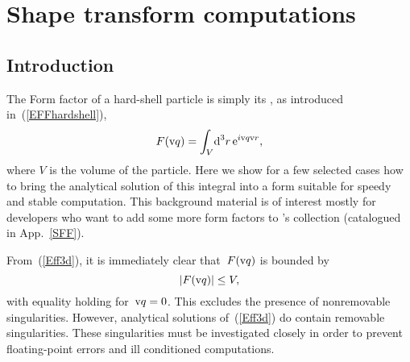 
\chapter{Shape transform computations}  \label{SFFcomp}


\section{Introduction}

The Form factor of a hard-shell particle is simply its ,
as introduced in~(\ref{EFFhardshell}),
\begin{equation}\label{Eff3d}
  F(\text{v}{q})=\int_V\!\text{d}^3r\, \text{e}^{i\text{v}{q}\text{v}{r}},
\end{equation}
where $V$ is the volume of the particle.
Here we show for a few selected cases
how to bring the analytical solution of this integral into a form
 suitable for speedy and stable computation.
This background material is of interest mostly for
developers who want to add some more form factors to \BornAgain's collection
(catalogued in App.~\ref{SFF}).

%
From~(\ref{Eff3d}), it is immediately clear that~$F(\text{v}{q})$ is bounded by
\begin{equation}
  |F(\text{v}{q})|\le V,
\end{equation}
with equality holding for~$\text{v}{q}=0$.
This excludes the presence of nonremovable singularities.
However, analytical solutions of~(\ref{Eff3d}) do contain
removable singularities.
These singularities must be investigated closely
in order to prevent floating-point errors and ill conditioned computations.

